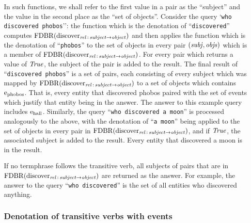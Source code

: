 \documentclass[../main.tex]{subfiles}
\begin{document}
\begin{refsection}
In such functions, we shall refer to the first value in a pair as the ``subject'' and the value in
the second place as the ``set of objects''.
Consider the query `\texttt{who discovered phobos}'': the function which is the denotation
of ``\texttt{discovered}'' computes $\operatorname{FDBR}({\operatorname{discover}_{\operatorname{\mathit{rel}}\,:\,\operatorname{\mathit{subject}} \rightarrow \operatorname{\mathit{object}}}})$ and then applies the function which is the
denotation of ``\texttt{phobos}'' to the set of objects in every pair $(\operatorname{\mathit{subj}}, \operatorname{\mathit{objs}})$ which is a member of
$\operatorname{FDBR}({\operatorname{discover}_{\operatorname{\mathit{rel}}\,:\,\operatorname{\mathit{subject}} \rightarrow \operatorname{\mathit{object}}}})$. For every pair which returns a value of $\operatorname{\mathit{True}}$, the subject of the pair is added to
the result. The final result of ``\texttt{discovered
phobos}'' is a set of pairs, each consisting of every subject which was mapped by $\operatorname{FDBR}({\operatorname{discover}_{\operatorname{\mathit{rel}}\,:\,\operatorname{\mathit{subject}} \rightarrow \operatorname{\mathit{object}}}})$
to a set of objects which contains $\mathrm{e}_{\operatorname{phobos}}$. That is, every entity that discovered phobos paired with the set of events which justify that entity being in the answer. The
answer to this example query includes $\mathrm{e}_{\operatorname{hall}}$. Similarly, the query ``\texttt{who discovered a moon}'' is
processed analogously to the above, with the denotation of ``\texttt{a moon}'' being applied to the set of
objects in every pair in $\operatorname{FDBR}({\operatorname{discover}_{\operatorname{\mathit{rel}}\,:\,\operatorname{\mathit{subject}} \rightarrow \operatorname{\mathit{object}}}})$, and if $\operatorname{\mathit{True}}$, the associated subject is added to
the result. Every entity that discovered a moon is in the result.

If no termphrase follows the transitive verb, all subjects of pairs that are in
$\operatorname{FDBR}({\operatorname{discover}_{\operatorname{\mathit{rel}}\,:\,\operatorname{\mathit{subject}} \rightarrow \operatorname{\mathit{object}}}})$ are returned as the answer. For example, the answer to the query
``\texttt{who discovered}'' is the set of all entities who discovered anything.

\subsubsection{Denotation of transitive verbs with events}
\label{ext:transevents}


\end{refsection}
\end{document}
